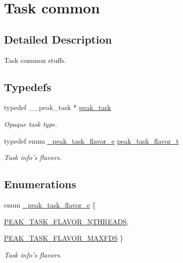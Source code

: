 \hypertarget{group__task__common}{
\section{Task common}
\label{group__task__common}
}


\subsection{Detailed Description}
Task common stuffs. 

\subsection*{Typedefs}
\begin{CompactItemize}
\item 
typedef \_\-\_\-peak\_\-task $\ast$ \hyperlink{group__task__common_ga0}{peak\_\-task}
\begin{CompactList}\small\item\em Opaque task type. \item\end{CompactList}\item 
typedef enum \hyperlink{group__task__common_ga10}{\_\-peak\_\-task\_\-flavor\_\-e} \hyperlink{group__task__common_ga1}{peak\_\-task\_\-flavor\_\-t}
\begin{CompactList}\small\item\em Task info's flavors. \item\end{CompactList}\end{CompactItemize}
\subsection*{Enumerations}
\begin{CompactItemize}
\item 
enum \hyperlink{group__task__common_ga10}{\_\-peak\_\-task\_\-flavor\_\-e} \{ \par
\hyperlink{group__task__common_gga10a2}{PEAK\_\-TASK\_\-FLAVOR\_\-NTHREADS}, 
\par
\hyperlink{group__task__common_gga10a3}{PEAK\_\-TASK\_\-FLAVOR\_\-MAXFDS}
 \}
\begin{CompactList}\small\item\em Task info's flavors. \item\end{CompactList}\end{CompactItemize}
